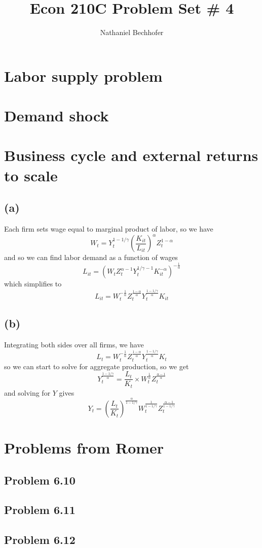 \documentclass[11pt]{amsart}
\title{Econ 210C Problem Set \# 4}
\author{Nathaniel Bechhofer}
\begin{document}
\maketitle

\section{Labor supply problem}
\section{Demand shock}

\section{Business cycle and external returns to scale}

\subsection*{(a)}

Each firm sets wage equal to marginal product of labor, so we have
\[
W_t = Y_t^{1-1/\gamma} \left(\frac{K_{it}}{L_{it}}\right)^{\alpha} Z_t^{1-\alpha}
\]
and so we can find labor demand as a function of wages
\[
L_{it} = (W_t Z_t^{\alpha-1} Y_t^{1/\gamma -1} K_{it}^{-\alpha})^{-\frac{1}{\alpha}}
\]
which simplifies to
\[
L_{it} = W_t^{-\frac{1}{\alpha}} Z_t^{\frac{1-\alpha}{\alpha}} Y_t^{\frac{1-1/\gamma}{\alpha}} K_{it}
\]

\subsection*{(b)}

Integrating both sides over all firms, we have
\[
L_t = W_t^{-\frac{1}{\alpha}} Z_t^{\frac{1-\alpha}{\alpha}} Y_t^{\frac{1-1/\gamma}{\alpha}} K_t
\]
so we can start to solve for aggregate production, so we get
\[
Y_t^{\frac{1-1/\gamma}{\alpha}} = \frac{L_t}{K_t} \times W_t^{\frac{1}{\alpha}} Z_t^{\frac{\alpha - 1}{\alpha}}
\]
and solving for $Y$ gives
\[
Y_t = \left(\frac{L_t}{K_t} \right)^{\frac{\alpha}{1-1/\gamma}} W_t^{\frac{1}{1-1/\gamma}} Z_t^{\frac{\alpha - 1}{1-1/\gamma}}
\]



\section{Problems from Romer}
\subsection{Problem 6.10}

\subsection{Problem 6.11}

\subsection{Problem 6.12}
\end{document}

